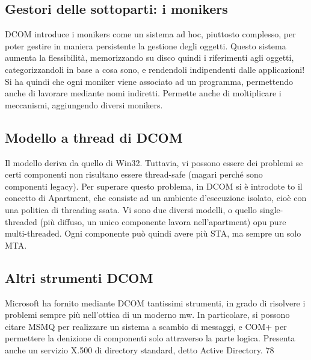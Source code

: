 \subsection{Gestori delle sottoparti: i monikers}
DCOM introduce i monikers come un sistema ad hoc, piuttosto complesso, per
poter gestire in maniera persistente la gestione degli oggetti. Questo sistema
aumenta la flessibilità, memorizzando su disco quindi i riferimenti agli oggetti,
categorizzandoli in base a cosa sono, e rendendoli indipendenti dalle applicazioni!
Si ha quindi che ogni moniker viene associato ad un programma, permettendo
anche di lavorare mediante nomi indiretti. Permette anche di moltiplicare i
meccanismi, aggiungendo diversi monikers.
\subsection{Modello a thread di DCOM}
Il modello deriva da quello di Win32. Tuttavia, vi possono essere dei problemi se certi componenti non risultano essere
thread-safe (magari perché sono
componenti legacy). Per superare questo problema, in DCOM si è introdote
to il concetto di Apartment, che consiste ad un ambiente d'esecuzione isolato,
cioè con una politica di threading ssata. Vi sono due diversi modelli, o quello
single-threaded (più diffuso, un unico componente lavora nell'apartment) opu
pure multi-threaded. Ogni componente può quindi avere più STA, ma sempre
un solo MTA.
\subsection{Altri strumenti DCOM}
Microsoft ha fornito mediante DCOM tantissimi strumenti, in grado di risolvere
i problemi sempre più nell'ottica di un moderno mw.
In particolare, si possono citare MSMQ per realizzare un sistema a scambio di
messaggi, e COM+ per permettere la denizione di componenti solo attraverso
la parte logica. Presenta anche un servizio X.500 di directory standard, detto
Active Directory.
78
